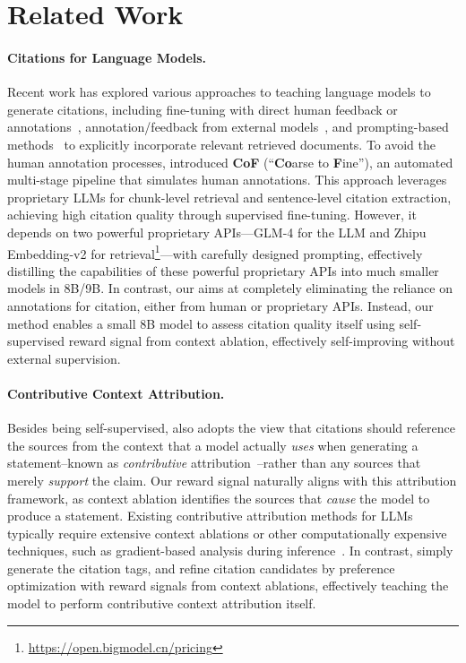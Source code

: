 \section{Related Work}
\label{sec:related_work}

\paragraph{Citations for Language Models.}

Recent work has explored various approaches to teaching language models to generate citations, including fine-tuning with direct human feedback or annotations~\citep{nakano2021webgpt,menick2022teaching,slobodkin2024attribute}, annotation/feedback from external models~\citep{huang2024training}, and prompting-based methods~\citep{gao2022rarr, gao2023enabling} to explicitly incorporate relevant retrieved documents. To avoid the human annotation processes, \citet{zhang2024longcite} introduced \textbf{CoF} (“\textbf{Co}arse to \textbf{F}ine”), an automated multi-stage pipeline that simulates human annotations. 
This approach leverages proprietary LLMs for chunk-level retrieval and sentence-level citation extraction, achieving high citation quality through supervised fine-tuning. However, it depends on two powerful proprietary APIs—GLM-4 for the LLM and Zhipu Embedding-v2 for retrieval\footnote{\url{https://open.bigmodel.cn/pricing}}—with carefully designed prompting, effectively distilling the capabilities of these powerful proprietary APIs into much smaller models in 8B/9B.
In contrast, our \ours aims at completely eliminating the reliance on annotations for citation, either from human or proprietary APIs. Instead, our method enables a small 8B model to assess citation quality itself using self-supervised reward signal from context ablation, effectively self-improving without external supervision.

\paragraph{Contributive Context Attribution.}

Besides being self-supervised, \ours also adopts the view that citations should reference the sources from the context that a model actually \emph{uses} when generating a statement--known as \emph{contributive} attribution~\citep{worledge2023unifying}--rather than any sources that merely \emph{support} the claim.
Our reward signal naturally aligns with this attribution framework, as context ablation identifies the sources that \emph{cause} the model to produce a statement. Existing contributive attribution methods for LLMs typically require extensive context ablations or other computationally expensive techniques, such as gradient-based analysis during inference~\citep{cohen2024contextcite,Qi2024ModelIA,phukan2024peering}.
In contrast, \ours simply generate the citation tags, and refine citation candidates by preference optimization with reward signals from context ablations, effectively teaching the model to perform contributive context attribution itself.

